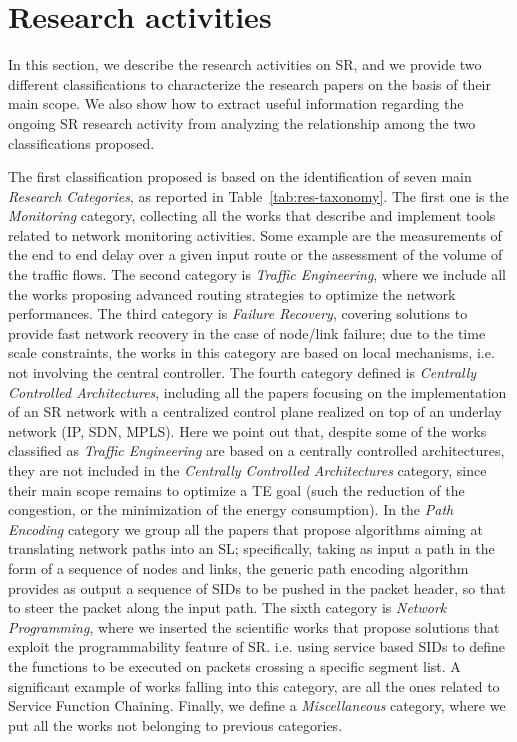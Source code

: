 \section{Research activities}
\label{sec:research}


In this section, we describe the research activities on SR, and we provide two different classifications to characterize the research papers on the basis of their main scope. We also show how to extract useful information regarding the ongoing SR research activity from analyzing the relationship among the two classifications proposed.

The first classification proposed is based on the identification of seven main \emph{Research Categories}, as reported in Table~\ref{tab:res-taxonomy}.
The first one is the \emph{Monitoring} category, collecting all the works that describe and implement tools related to network monitoring activities.
Some example are the measurements of the end to end delay over a given input route or the assessment of the volume of the traffic flows.
The second category is \emph{Traffic Engineering}, where we include all the works proposing advanced routing strategies to optimize the network performances.
The third category is \emph{Failure Recovery}, covering solutions to provide fast network recovery in the case of node/link failure; due to the time scale constraints, the works in this category are based on local mechanisms, i.e. not involving the central controller.
The fourth category defined is \emph{Centrally Controlled Architectures}, including all the papers focusing on the implementation of an SR network with a centralized control plane realized on top of an underlay network (IP, SDN, MPLS). Here we point out that, despite some of the works classified as \emph{Traffic Engineering} are based on a centrally controlled architectures, they are not included in the \emph{Centrally Controlled Architectures} category, since their main scope remains to optimize a TE goal (such the reduction of the congestion, or the minimization of the energy consumption).
In the \emph{Path Encoding} category we group all the papers that propose algorithms aiming at translating network paths into an SL; specifically, taking as input a path in the form of a sequence of nodes and links, the generic path encoding algorithm provides as output a sequence of SIDs to be pushed in the packet header, so that to steer the packet along the input path.
The sixth category is \emph{Network Programming}, where we inserted the scientific works that propose solutions that exploit the programmability feature of SR. i.e. using service based SIDs to define the functions to be executed on packets crossing a specific segment list. A significant example of works falling into this category, are all the ones related to Service Function Chaining.  
Finally, we define a \emph{Miscellaneous} category, where we put all the works not belonging to previous categories.

